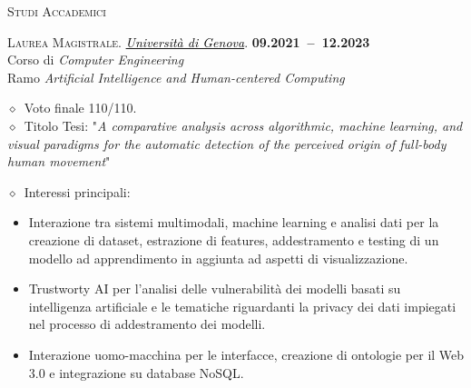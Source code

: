 \documentclass[11pt, a4paper]{article}
\newcommand{\dates}[1]{\hfill\mbox{\textbf{#1}}} %
\newcommand{\smaller}[1]{{\small$\diamond$\ #1}}
\newcommand{\headright}[1]{\vspace*{1.8ex}\textsc{\Large\color{cvblue}#1}\par%
     \vspace*{-2.5ex}{\color{cvblue}\hrulefill}\par}
\begin{document}
\begin{minipage}[t]{0.57\textwidth}
        \begin{translate}
            \headright{Studi Accademici}
            \textsc{Laurea Magistrale.} \href{https://unige.it/}{\textcolor{black}{\textit{Università di Genova}}}. \dates{09.2021 -- 12.2023} \\%
            Corso di \textit{Computer Engineering} \\%
            Ramo \textit{Artificial Intelligence and Human-centered Computing}
        \end{translate}

        \begin{translate}
            \smaller{Voto finale} 110/110. \\
            \smaller{Titolo Tesi}: "\textit{A comparative analysis across algorithmic, machine learning, and visual paradigms for the automatic detection of the perceived origin of full-body human movement}" \href{https://github.com/gaggioaxel/OoM-Thesis}{\textcolor{black}{\faExternalLink}} \\
            \smaller{Interessi principali: 
                \begin{itemize}
                    \item Interazione tra sistemi multimodali, machine learning e analisi dati per la creazione di dataset, estrazione di features, addestramento e testing di un modello ad apprendimento in aggiunta ad aspetti di visualizzazione.
                    \item Trustworty AI per l'analisi delle vulnerabilità dei modelli basati su intelligenza artificiale e le tematiche riguardanti la privacy dei dati impiegati nel processo di addestramento dei modelli.
                    \item Interazione uomo-macchina per le interfacce, creazione di ontologie per il Web 3.0 e integrazione su database NoSQL.
                \end{itemize}
            }
        \end{translate}


\end{minipage}
\end{document}
